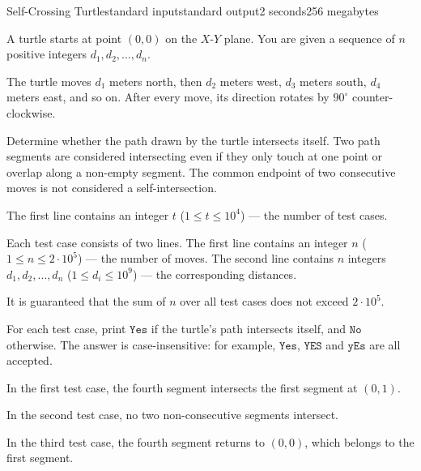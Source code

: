 \begin{problem}{Self-Crossing Turtle}{standard input}{standard output}{2 seconds}{256 megabytes}

A turtle starts at point $(0, 0)$ on the $X$-$Y$ plane. You are given a sequence of $n$ positive integers $d_1, d_2, \ldots, d_n$.

The turtle moves $d_1$ meters north, then $d_2$ meters west, $d_3$ meters south, $d_4$ meters east, and so on. After every move, its direction rotates by $90^\circ$ counter-clockwise.

Determine whether the path drawn by the turtle intersects itself. Two path segments are considered intersecting even if they only touch at one point or overlap along a non-empty segment. The common endpoint of two consecutive moves is not considered a self-intersection.


\InputFile
The first line contains an integer $t$ ($1 \le t \le 10^4$) --- the number of test cases.

Each test case consists of two lines. The first line contains an integer $n$ ($1 \le n \le 2 \cdot 10^5$) --- the number of moves. The second line contains $n$ integers $d_1, d_2, \ldots, d_n$ ($1 \le d_i \le 10^9$) --- the corresponding distances.

It is guaranteed that the sum of $n$ over all test cases does not exceed $2 \cdot 10^5$.


\OutputFile
For each test case, print $\texttt{Yes}$ if the turtle's path intersects itself, and $\texttt{No}$ otherwise. The answer is case-insensitive: for example, $\texttt{Yes}$, $\texttt{YES}$ and $\texttt{yEs}$ are all accepted.


\Example

\begin{example}
%
\end{example}

\Note
In the first test case, the fourth segment intersects the first segment at $(0,1)$.

In the second test case, no two non-consecutive segments intersect.

In the third test case, the fourth segment returns to $(0,0)$, which belongs to the first segment.

\end{problem}

